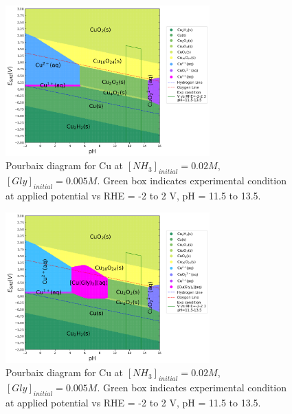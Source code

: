 \documentclass[journal=jacsat,manuscript=article,email=false]{achemso}
\begin{document}
\begin{figure}[htbp]
    \centering
    \includegraphics[width=0.7\textwidth]{Figures/pourbaix_diagrams/Cu-NH3-H2O_activity=1e-04_[NH3]=0M_[Gly]=0M_[CN]=0.png}
    \caption{Pourbaix diagram for Cu at $[NH_3]_{initial}= 0.02M$, $[Gly]_{initial}=0.005M$. Green box indicates experimental condition at applied potential vs RHE = -2 to 2 V, pH = 11.5 to 13.5.}
    \label{fig:Cu_Pourbaix_NH3_Gly_SI}
\end{figure}
\begin{figure}[htbp]
    \centering
    \includegraphics[width=0.7\textwidth]{Figures/pourbaix_diagrams/Cu-NH3-H2O_activity=1e-04_[NH3]=0.02M_[Gly]=0.005M_[CN]=0.png}
    \caption{Pourbaix diagram for Cu at $[NH_3]_{initial}= 0.02M$, $[Gly]_{initial}=0.005M$. Green box indicates experimental condition at applied potential vs RHE = -2 to 2 V, pH = 11.5 to 13.5.}
    \label{fig:Cu_Pourbaix_NH3_Gly_SI}
\end{figure}
\end{document}

